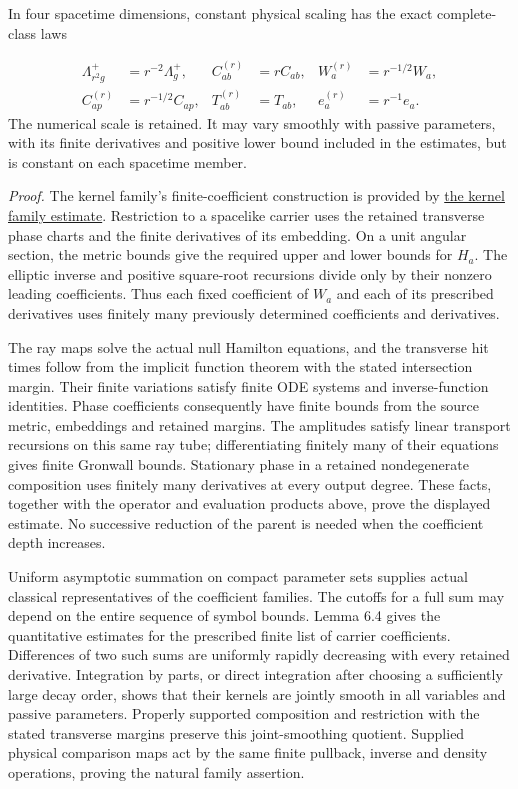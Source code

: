 \documentclass[
  english,
  11pt,
  reqno]{amsart}
\begin{document}
In four spacetime dimensions, constant physical scaling has the exact
complete-class laws

\label{eq:online-wave-carrier-physical-scale} \[
\begin{aligned}
\Lambda_{r^2g}^+&=r^{-2}\Lambda_g^+,&
C_{ab}^{(r)}&=rC_{ab},&
W_a^{(r)}&=r^{-1/2}W_a,\\
C_{ap}^{(r)}&=r^{-1/2}C_{ap},&
T_{ab}^{(r)}&=T_{ab},&
e_a^{(r)}&=r^{-1}e_a.
\end{aligned}
\] The numerical scale is retained. It may vary smoothly with passive
parameters, with its finite derivatives and positive lower bound
included in the estimates, but is constant on each spacetime member.

\emph{Proof.} The kernel family's finite-coefficient construction is
provided by \hyperref[prop:online-wave-kernel-finite-families]{the
kernel family estimate}. Restriction to a spacelike carrier uses the
retained transverse phase charts and the finite derivatives of its
embedding. On a unit angular section, the metric bounds give the
required upper and lower bounds for \(H_a\). The elliptic inverse and
positive square-root recursions divide only by their nonzero leading
coefficients. Thus each fixed coefficient of \(W_a\) and each of its
prescribed derivatives uses finitely many previously determined
coefficients and derivatives.

The ray maps solve the actual null Hamilton equations, and the
transverse hit times follow from the implicit function theorem with the
stated intersection margin. Their finite variations satisfy finite ODE
systems and inverse-function identities. Phase coefficients consequently
have finite bounds from the source metric, embeddings and retained
margins. The amplitudes satisfy linear transport recursions on this same
ray tube; differentiating finitely many of their equations gives finite
Gronwall bounds. Stationary phase in a retained nondegenerate
composition uses finitely many derivatives at every output degree. These
facts, together with the operator and evaluation products above, prove
the displayed estimate. No successive reduction of the parent is needed
when the coefficient depth increases.

Uniform asymptotic summation on compact parameter sets supplies actual
classical representatives of the coefficient families. The cutoffs for a
full sum may depend on the entire sequence of symbol bounds. Lemma 6.4
gives the quantitative estimates for the prescribed finite list of
carrier coefficients. Differences of two such sums are uniformly rapidly
decreasing with every retained derivative. Integration by parts, or
direct integration after choosing a sufficiently large decay order,
shows that their kernels are jointly smooth in all variables and passive
parameters. Properly supported composition and restriction with the
stated transverse margins preserve this joint-smoothing quotient.
Supplied physical comparison maps act by the same finite pullback,
inverse and density operations, proving the natural family assertion.
\end{document}
